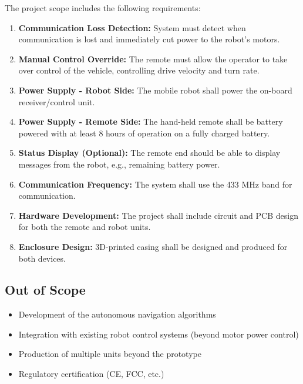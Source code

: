 The project scope includes the following requirements:

\begin{enumerate}
    \item \textbf{Communication Loss Detection:} System must detect when communication is lost and immediately cut power to the robot's motors.
    
    \item \textbf{Manual Control Override:} The remote must allow the operator to take over control of the vehicle, controlling drive velocity and turn rate.
    
    \item \textbf{Power Supply - Robot Side:} The mobile robot shall power the on-board receiver/control unit.
    
    \item \textbf{Power Supply - Remote Side:} The hand-held remote shall be battery powered with at least 8 hours of operation on a fully charged battery.
    
    \item \textbf{Status Display (Optional):} The remote end should be able to display messages from the robot, e.g., remaining battery power.
    
    \item \textbf{Communication Frequency:} The system shall use the 433 MHz band for communication.
    
    \item \textbf{Hardware Development:} The project shall include circuit and PCB design for both the remote and robot units.
    
    \item \textbf{Enclosure Design:} 3D-printed casing shall be designed and produced for both devices.
\end{enumerate}

\subsection*{Out of Scope}
\begin{itemize}
    \item Development of the autonomous navigation algorithms
    \item Integration with existing robot control systems (beyond motor power control)
    \item Production of multiple units beyond the prototype
    \item Regulatory certification (CE, FCC, etc.)
\end{itemize}
